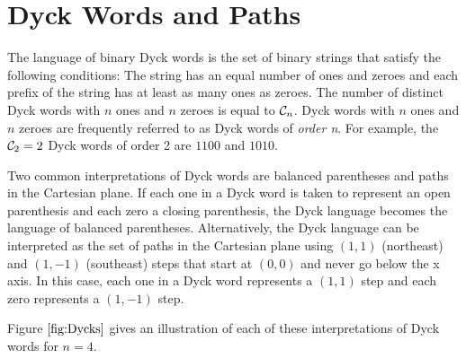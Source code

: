 \section{Dyck Words and Paths} \label{sec:Dycks}

The language of binary Dyck words is the set of binary strings that satisfy the following conditions: The string has an equal number of ones and zeroes and each prefix of the string has at least as many ones as zeroes.  The number of distinct Dyck words with $n$ ones and $n$ zeroes is equal to $\mathcal{C}_n$.  Dyck words with $n$ ones and $n$ zeroes are frequently referred to as Dyck words of \emph{order n}.
For example, the $\mathcal{C}_2=2$ Dyck words of order 2 are $1100$ and $1010$.

Two common interpretations of Dyck words are balanced parentheses and paths in the Cartesian plane. If each one in a Dyck word is taken to represent an open parenthesis and each zero a closing parenthesis, the Dyck language becomes the language of balanced parentheses.  Alternatively, the Dyck language can be interpreted as the set of paths in the Cartesian plane using $(1,1)$ (northeast) and $(1,-1)$ (southeast) steps that start at $(0,0)$ and never go below the x axis. In this case, each one in a Dyck word represents a $(1,1)$ step and each zero represents a $(1,-1)$ step.

Figure $\ref{fig:Dycks}$ gives an illustration of each of these interpretations of Dyck words for $n=4$.

